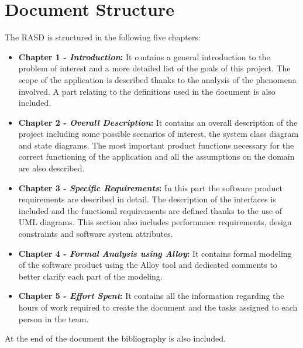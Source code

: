 \section{Document Structure}

The RASD is structured in the following five chapters:
\begin{itemize}
\item \textbf{Chapter 1 -  \textit{Introduction}:} It contains a general introduction to the problem of interest and a more detailed list of the goals of this project. The scope of the application is described thanks to the analysis of the phenomena involved.
A part relating to the definitions used in the document is also included.

\item \textbf{Chapter 2 -  \textit{Overall Description}:} It contains an overall description of the project including some possible scenarios of interest, the system class diagram and state diagrams.
The most important product functions necessary for the correct functioning of the application and all the assumptions on the domain are also described.

\item \textbf{Chapter 3 -  \textit{Specific Requirements}:} In this part the software product requirements are described in detail.
The description of the interfaces is included and the functional requirements are defined thanks to the use of UML diagrams.
This section also includes performance requirements, design constraints and software system attributes.

\item \textbf{Chapter 4 -  \textit{Formal Analysis using Alloy}:} It contains formal modeling of the software product using the Alloy tool and dedicated comments to better clarify each part of the modeling.

\item \textbf{Chapter 5 -  \textit{Effort Spent}:} It contains all the information regarding the hours of work required to create the document and the tasks assigned to each person in the team.
\end{itemize}

At the end of the document the bibliography is also included.
